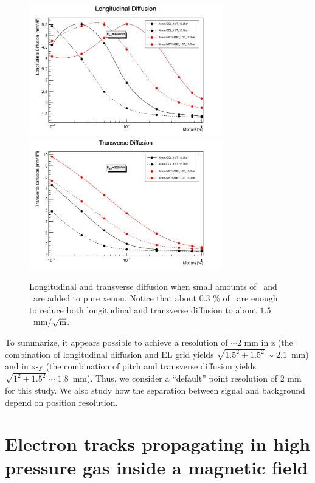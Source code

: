 \documentclass{JINST}
\begin{document}
\begin{figure}[!htb]
	\centering
	\includegraphics[width=0.75\textwidth]{img/Longitudinal_Diffusion300Vcm.pdf}
	\includegraphics[width=0.75\textwidth]{img/Transverse_Diffusion300Vcm.pdf}
	\caption{\label{fig.DIF}Longitudinal and transverse diffusion when small amounts of \COT\ and \CHF\ are added to pure xenon. Notice that about 0.3 \% of \COT\ are enough to reduce both longitudinal and transverse diffusion to about $1.5$~mm/$\sqrt{\rm{m}}$.}
\end{figure}

To summarize, it appears possible to achieve a resolution of $\sim$2 mm in z (the combination of 
longitudinal diffusion and EL grid yields $\sqrt{1.5^2+1.5^2} \sim 2.1$~mm) and in x-y
(the combination of pitch and transverse diffusion yields $\sqrt{1^2+1.5^2} \sim 1.8$~mm). Thus, we
 consider a ``default'' point resolution of 2 mm for this study. We also study how the separation between signal and background depend on position resolution.

\section{Electron tracks propagating in high pressure gas inside a magnetic field}\label{sec.magmotion}
\end{document}
